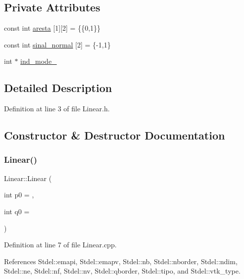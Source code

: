 \subsection*{Private Attributes}
\begin{DoxyCompactItemize}
\item 
const int \hyperlink{classLinear_a43f44fdc5222ab9b142aff780336b2b8}{aresta} \mbox{[}1\mbox{]}\mbox{[}2\mbox{]} = \{\{0,1\}\}
\item 
const int \hyperlink{classLinear_a4bfb0666908c95ae7abcad0501e39ca9}{sinal\+\_\+normal} \mbox{[}2\mbox{]} = \{-\/1,1\}
\item 
int $\ast$ \hyperlink{classLinear_a0eeb0a90d257978adc2bbc997e024994}{ind\+\_\+mode\+\_\+}
\end{DoxyCompactItemize}


\subsection{Detailed Description}


Definition at line 3 of file Linear.\+h.



\subsection{Constructor \& Destructor Documentation}
\mbox{\label{classLinear_a662bb0cec9af370ae7de4bab5b4f3675}} 
\subsubsection{\texorpdfstring{Linear()}{Linear()}}
{\footnotesize\ttfamily Linear\+::\+Linear (\begin{DoxyParamCaption}\item[{int}]{p0 = {},  }\item[{int}]{q0 = {} }\end{DoxyParamCaption})}



Definition at line 7 of file Linear.\+cpp.



References Stdel\+::emapi, Stdel\+::emapv, Stdel\+::nb, Stdel\+::nborder, Stdel\+::ndim, Stdel\+::ne, Stdel\+::nf, Stdel\+::nv, Stdel\+::qborder, Stdel\+::tipo, and Stdel\+::vtk\+\_\+type.

\mbox{\label{classLinear_a6abe6c2b55a1e1c3e838aaf82e77e627}} 
